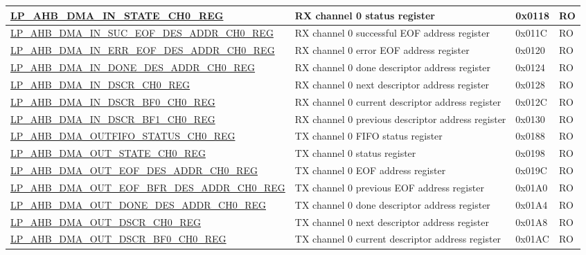 \begin{longtable}{ | l | p{10cm} | p{1.3cm} | l | }
\hyperref[regdesc:LPAHBDMAINSTATECHNREG]{LP\_AHB\_DMA\_IN\_STATE\_CH0\_REG} & RX channel 0 status register & 0x0118 & RO \\ \hline
\hyperref[regdesc:LPAHBDMAINSUCEOFDESADDRCHNREG]{LP\_AHB\_DMA\_IN\_SUC\_EOF\_DES\_ADDR\_CH0\_REG} & RX channel 0 successful EOF address register & 0x011C & RO \\ \hline
\hyperref[regdesc:LPAHBDMAINERREOFDESADDRCHNREG]{LP\_AHB\_DMA\_IN\_ERR\_EOF\_DES\_ADDR\_CH0\_REG} & RX channel 0 error EOF address register & 0x0120 & RO \\ \hline
\hyperref[regdesc:LPAHBDMAINDONEDESADDRCHNREG]{LP\_AHB\_DMA\_IN\_DONE\_DES\_ADDR\_CH0\_REG} & RX channel 0 done descriptor address register & 0x0124 & RO \\ \hline
\hyperref[regdesc:LPAHBDMAINDSCRCHNREG]{LP\_AHB\_DMA\_IN\_DSCR\_CH0\_REG} & RX channel 0 next descriptor address register & 0x0128 & RO \\ \hline
\hyperref[regdesc:LPAHBDMAINDSCRBF0CHNREG]{LP\_AHB\_DMA\_IN\_DSCR\_BF0\_CH0\_REG} & RX channel 0 current descriptor address register & 0x012C & RO \\ \hline
\hyperref[regdesc:LPAHBDMAINDSCRBF1CHNREG]{LP\_AHB\_DMA\_IN\_DSCR\_BF1\_CH0\_REG} & RX channel 0 previous descriptor address register & 0x0130 & RO \\ \hline
\hyperref[regdesc:LPAHBDMAOUTFIFOSTATUSCHNREG]{LP\_AHB\_DMA\_OUTFIFO\_STATUS\_CH0\_REG} & TX channel 0 FIFO status register & 0x0188 & RO \\ \hline
\hyperref[regdesc:LPAHBDMAOUTSTATECHNREG]{LP\_AHB\_DMA\_OUT\_STATE\_CH0\_REG} & TX channel 0 status register & 0x0198 & RO \\ \hline
\hyperref[regdesc:LPAHBDMAOUTEOFDESADDRCHNREG]{LP\_AHB\_DMA\_OUT\_EOF\_DES\_ADDR\_CH0\_REG} & TX channel 0 EOF address register & 0x019C & RO \\ \hline
\hyperref[regdesc:LPAHBDMAOUTEOFBFRDESADDRCHNREG]{LP\_AHB\_DMA\_OUT\_EOF\_BFR\_DES\_ADDR\_CH0\_REG} & TX channel 0 previous EOF address register & 0x01A0 & RO \\ \hline
\hyperref[regdesc:LPAHBDMAOUTDONEDESADDRCHNREG]{LP\_AHB\_DMA\_OUT\_DONE\_DES\_ADDR\_CH0\_REG} & TX channel 0 done descriptor address register & 0x01A4 & RO \\ \hline
\hyperref[regdesc:LPAHBDMAOUTDSCRCHNREG]{LP\_AHB\_DMA\_OUT\_DSCR\_CH0\_REG} & TX channel 0 next descriptor address register & 0x01A8 & RO \\ \hline
\hyperref[regdesc:LPAHBDMAOUTDSCRBF0CHNREG]{LP\_AHB\_DMA\_OUT\_DSCR\_BF0\_CH0\_REG} & TX channel 0 current descriptor address register & 0x01AC & RO \\ \hline

\end{longtable}
